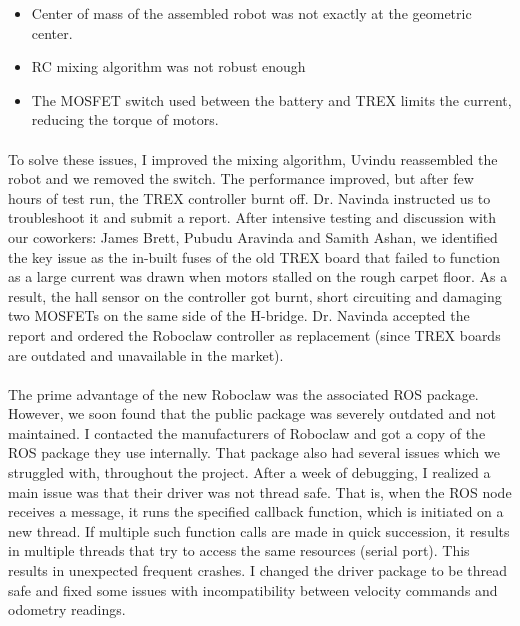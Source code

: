\begin{itemize}
    \item Center of mass of the assembled robot was not exactly at the geometric center.
    \item RC mixing algorithm was not robust enough
    \item The MOSFET switch used between the battery and TREX limits the current, reducing the torque of motors.
\end{itemize} 

\paragraph{}
To solve these issues, I improved the mixing algorithm, Uvindu reassembled the robot and we removed the switch. The performance improved, but after few hours of test run, the TREX controller burnt off. Dr. Navinda instructed us to troubleshoot it and submit a report. After intensive testing and discussion with our coworkers: James Brett, Pubudu Aravinda and Samith Ashan, we identified the key issue as the in-built fuses of the old TREX board that failed to function as a large current was drawn when motors stalled on the rough carpet floor. As a result, the hall sensor on the controller got burnt, short circuiting and damaging two MOSFETs on the same side of the H-bridge. Dr. Navinda accepted the report and ordered the Roboclaw controller as replacement (since TREX boards are outdated and unavailable in the market). 

\paragraph{}
The prime advantage of the new Roboclaw was the associated ROS package. However, we soon found that the public package was severely outdated and not maintained. I contacted the manufacturers of Roboclaw and got a copy of the ROS package they use internally. That package also had several issues which we struggled with, throughout the project. After a week of debugging, I realized a main issue was that their driver was not thread safe. That is, when the ROS node receives a message, it runs the specified callback function, which is initiated on a new thread. If multiple such function calls are made in quick succession, it results in multiple threads that try to access the same resources (serial port). This results in unexpected frequent crashes. I changed the driver package to be thread safe and fixed some issues with incompatibility between velocity commands and odometry readings.

